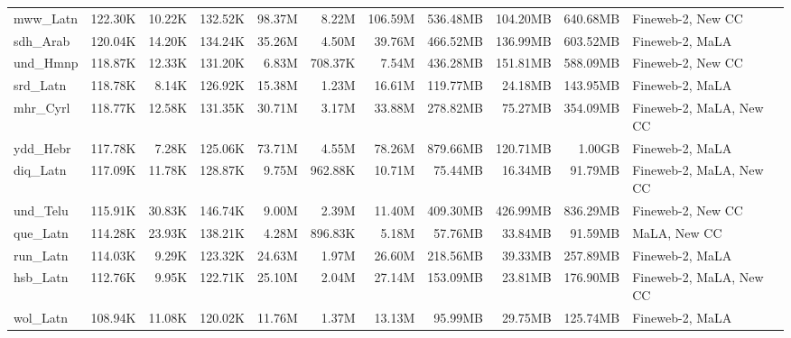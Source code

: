 \begin{table*}[!htp]
{\begin{tabular}{l|rrr|rrr|rrr|l}
mww\_Latn                   & 122.30K    & 10.22K       & 132.52K     & 98.37M       & 8.22M          & 106.59M       & 536.48MB   & 104.20MB     & 640.68MB    & Fineweb-2, New CC       \\
sdh\_Arab                   & 120.04K    & 14.20K       & 134.24K     & 35.26M       & 4.50M          & 39.76M        & 466.52MB   & 136.99MB     & 603.52MB    & Fineweb-2, MaLA         \\
und\_Hmnp                   & 118.87K    & 12.33K       & 131.20K     & 6.83M        & 708.37K        & 7.54M         & 436.28MB   & 151.81MB     & 588.09MB    & Fineweb-2, New CC       \\
srd\_Latn                   & 118.78K    & 8.14K        & 126.92K     & 15.38M       & 1.23M          & 16.61M        & 119.77MB   & 24.18MB      & 143.95MB    & Fineweb-2, MaLA         \\
mhr\_Cyrl                   & 118.77K    & 12.58K       & 131.35K     & 30.71M       & 3.17M          & 33.88M        & 278.82MB   & 75.27MB      & 354.09MB    & Fineweb-2, MaLA, New CC \\
ydd\_Hebr                   & 117.78K    & 7.28K        & 125.06K     & 73.71M       & 4.55M          & 78.26M        & 879.66MB   & 120.71MB     & 1.00GB      & Fineweb-2, MaLA         \\
diq\_Latn                   & 117.09K    & 11.78K       & 128.87K     & 9.75M        & 962.88K        & 10.71M        & 75.44MB    & 16.34MB      & 91.79MB     & Fineweb-2, MaLA, New CC \\
und\_Telu                   & 115.91K    & 30.83K       & 146.74K     & 9.00M        & 2.39M          & 11.40M        & 409.30MB   & 426.99MB     & 836.29MB    & Fineweb-2, New CC       \\
que\_Latn                   & 114.28K    & 23.93K       & 138.21K     & 4.28M        & 896.83K        & 5.18M         & 57.76MB    & 33.84MB      & 91.59MB     & MaLA, New CC            \\
run\_Latn                   & 114.03K    & 9.29K        & 123.32K     & 24.63M       & 1.97M          & 26.60M        & 218.56MB   & 39.33MB      & 257.89MB    & Fineweb-2, MaLA         \\
hsb\_Latn                   & 112.76K    & 9.95K        & 122.71K     & 25.10M       & 2.04M          & 27.14M        & 153.09MB   & 23.81MB      & 176.90MB    & Fineweb-2, MaLA, New CC \\
wol\_Latn                   & 108.94K    & 11.08K       & 120.02K     & 11.76M       & 1.37M          & 13.13M        & 95.99MB    & 29.75MB      & 125.74MB    & Fineweb-2, MaLA         \\

\end{tabular}}
\end{table*}

